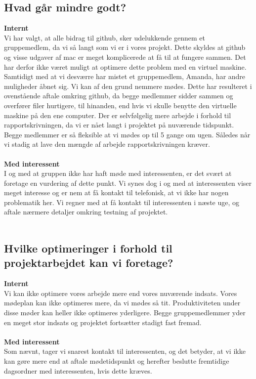 \documentclass[a4paper,12pt]{article}
\begin{document}
\subsection{Hvad går mindre godt?}
\textbf{Internt}
\\
Vi har valgt, at alle bidrag til github, sker udelukkende gennem et gruppemedlem, da vi så langt som vi er i vores projekt. Dette skyldes at github og visse udgaver af mac er meget komplicerede at få til at fungere sammen. Det har derfor ikke været muligt at optimere dette problem med en virtuel maskine. Samtidigt med at vi desværre har mistet et gruppemedlem, Amanda, har andre muligheder åbnet sig. Vi kan af den grund nemmere mødes. Dette har resulteret i ovenstående aftale omkring github, da begge medlemmer sidder sammen og overfører filer hurtigere, til hinanden, end hvis vi skulle benytte den virtuelle maskine på den ene computer.
Der er selvfølgelig mere arbejde i forhold til rapportskrivningen, da vi er nået langt i projektet på nuværende tidspunkt. Begge medlemmer er så fleksible at vi mødes op til 5 gange om ugen. Således når vi stadig at lave den mængde af arbejde rapportskrivningen kræver.
\\
\\
\textbf{Med interessent}
\\
I og med at gruppen ikke har haft møde med interessenten, er det svært at foretage en vurdering af dette punkt. Vi synes dog i og med at interessenten viser meget interesse og er nem at få kontakt til telefonisk, at vi ikke har nogen problematik her. Vi regner med at få kontakt til interessenten i næste uge, og aftale nærmere detaljer omkring testning af projektet.
\\
\\
\subsection{Hvilke optimeringer i forhold til projektarbejdet kan vi foretage?}
\textbf{Internt}
\\
Vi kan ikke optimere vores arbejde mere end vores nuværende indsats. Vores mødeplan kan ikke optimeres mere, da vi mødes så tit. Produktiviteten under disse møder kan heller ikke optimeres yderligere. Begge gruppemedlemmer yder en meget stor indsats og projektet fortsætter stadigt fast fremad.
\\
\\
\textbf{Med interessent}
\\
Som nævnt, tager vi snarest kontakt til interessenten, og det betyder, at vi ikke kan gøre mere end at aftale mødetidspunkt og herefter beslutte fremtidige dagsordner med interessenten, hvis dette kræves.
\end{document}
